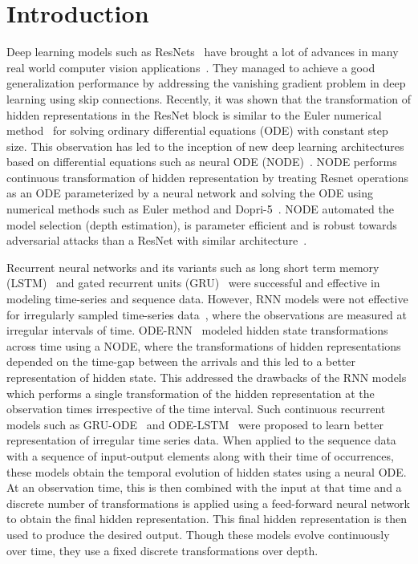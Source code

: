 \documentclass{article} %
\begin{document}
\section{Introduction} 
Deep learning models such as ResNets~\citep{he2016resnet} have brought a lot of advances in  many real world computer vision applications~\citep{ren17,he20,wang2019hierarchical}. They  managed to achieve a good generalization performance  by addressing the vanishing gradient problem in deep learning using skip connections. Recently, it was shown that the  transformation of hidden representations in the ResNet block is similar to the Euler numerical method~\citep{lu2018beyond,haber2017stable} for solving ordinary differential equations (ODE) with constant step size. This observation has led to the inception of new  deep learning architectures based on differential equations such as neural ODE (NODE)~\citep{node}. NODE performs continuous transformation of hidden representation by treating Resnet operations as an ODE parameterized by a neural network and solving the ODE using  numerical methods such as Euler method  and  Dopri-5~\citep{kimura2009dormand}. NODE automated the model selection (depth estimation), is parameter efficient and is robust  towards adversarial attacks than a  ResNet with similar architecture~\citep{robustode}. 


Recurrent neural networks and its variants such as long short term memory (LSTM)~\citep{lstm} and gated recurrent units (GRU)~\citep{gru} were successful and effective in modeling time-series and sequence data. However, RNN models were not effective  for irregularly sampled time-series data~\citep{rubanova2019latent}, where the observations are measured at irregular intervals of time. ODE-RNN~\citep{rubanova2019latent} modeled hidden state transformations across time using a NODE, where the transformations of hidden representations depended on the time-gap between the arrivals and this led to a better representation of hidden state. This addressed the drawbacks of the RNN models which  performs a single transformation of the hidden representation at the observation times irrespective of the time interval. Such continuous recurrent models such as  GRU-ODE~\citep{de2019gru} and ODE-LSTM~\citep{lechner2020learning} were proposed to learn better representation of irregular time series data.%
When  applied to the sequence data with a sequence of input-output elements along with their time of occurrences,  these models obtain the temporal evolution of hidden states using a neural ODE. At an observation time, this is  then combined with the input at that time and a discrete number of transformations is applied using a feed-forward neural network to obtain  the final hidden representation. This final hidden representation   is then used to produce  the desired output.  Though these models evolve continuously over time, they use a fixed discrete transformations over depth. 
\end{document}
